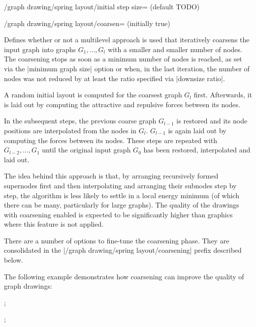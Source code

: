 \begin{key}{/graph drawing/spring layout/initial step 
  size= (default TODO)}

\end{key}

\begin{key}{/graph drawing/spring layout/coarsen=
  (initially true)}

  Defines whether or not a multilevel approach is used that
  iteratively coarsens the input graph into graphs $G_1,\dots,G_l$ with 
  a smaller and smaller number of nodes. The coarsening stops as soon as
  a minimum number of nodes is reached, as set via the 
  |minimum graph size| option or when, in the last iteration, the 
  number of nodes was not reduced by at least the ratio specified via 
  |downsize ratio|. 

  A random initial layout is computed for the coarsest graph $G_l$ first.
  Afterwards, it is laid out by computing the attractive and repulsive
  forces between its nodes. 
  
  In the subsequent steps, the previous coarse graph $G_{l-1}$ is 
  restored and its node positions are interpolated from the nodes in 
  $G_l$. $G_{l-1}$ is again laid out by computing the forces between 
  its nodes. These steps are repeated with $G_{l-2},\dots,G_1$ until 
  the original input graph $G_0$ has been restored, interpolated 
  and laid out.

  The idea behind this approach is that, by arranging recursively 
  formed supernodes first and then interpolating and arranging their
  subnodes step by step, the algorithm is less likely to settle in a
  local energy minimum (of which there can be many, particularly for
  large graphs). The quality of the drawings with coarsening enabled is
  expected to be significantly higher than graphics where this feature
  is not applied.

  There are a number of options to fine-tune the coarsening phase.
  They are consolidated in the |/graph drawing/spring layout/coarsening|
  prefix described below.

  The following example demonstrates how coarsening can improve the
  quality of graph drawings:
  \begin{codeexample}[]
\tikz {};

\tikz {};
  \end{codeexample}
\end{key}

